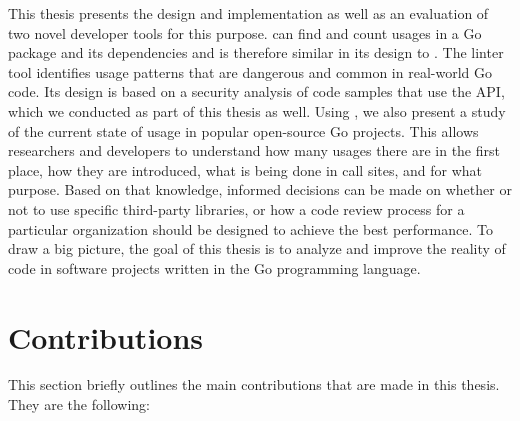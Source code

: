 This thesis presents the design and implementation as well as an evaluation of two novel developer tools for this
purpose.
\toolGeiger{} can find and count \unsafe{} usages in a Go package and its dependencies and is therefore similar in its
design to \toolCargoGeiger{}.
The linter tool \toolSafer{} identifies \unsafe{} usage patterns that are dangerous and common in real-world Go code.
Its design is based on a security analysis of code samples that use the \unsafe{} \acrshort{API}, which we conducted as
part of this thesis as well.
Using \toolGeiger{}, we also present a study of the current state of \unsafe{} usage in popular open-source Go projects.
This allows researchers and developers to understand how many usages there are in the first place, how they are
introduced, what is being done in \unsafe{} call sites, and for what purpose.
Based on that knowledge, informed decisions can be made on whether or not to use specific third-party libraries, or how
a code review process for a particular organization should be designed to achieve the best performance.
To draw a big picture, the goal of this thesis is to analyze and improve the reality of \unsafe{} code in software
projects written in the Go programming language.




\section{Contributions}\label{sec:contributions}

This section briefly outlines the main contributions that are made in this thesis.
They are the following:

